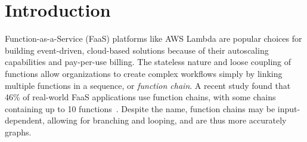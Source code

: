 \section{Introduction}
\label{sec:intro}

Function-as-a-Service (FaaS) platforms like AWS Lambda are popular choices for
building event-driven, cloud-based solutions because of their autoscaling
capabilities and pay-per-use billing.
%
%
The stateless nature and loose coupling of functions allow organizations to
create complex workflows simply by linking multiple functions in a sequence, or
\emph{function chain}.
%
A recent study found that 46\% of real-world FaaS applications use function
chains, with some chains containing up to 10
functions~\cite{20-atc-serverless_in_the_wild}.
%
%
Despite the name, function chains may be input-dependent, allowing for branching
and looping, and are thus more accurately graphs.



